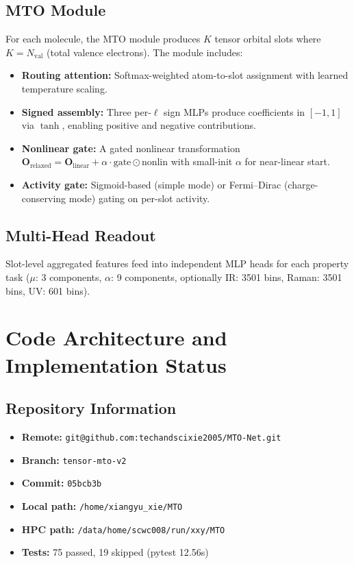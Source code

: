 \documentclass[11pt,a4paper]{article}
\begin{document}
\subsection{MTO Module}
For each molecule, the MTO module produces $K$ tensor orbital slots where $K = N_\text{val}$ (total valence electrons). The module includes:
\begin{itemize}[nosep]
    \item \textbf{Routing attention:} Softmax-weighted atom-to-slot assignment with learned temperature scaling.
    \item \textbf{Signed assembly:} Three per-$\ell$ sign MLPs produce coefficients in $[-1,1]$ via $\tanh$, enabling positive and negative contributions.
    \item \textbf{Nonlinear gate:} A gated nonlinear transformation $\mathbf{O}_\text{relaxed} = \mathbf{O}_\text{linear} + \alpha \cdot \text{gate} \odot \text{nonlin}$ with small-init $\alpha$ for near-linear start.
    \item \textbf{Activity gate:} Sigmoid-based (simple mode) or Fermi--Dirac (charge-conserving mode) gating on per-slot activity.
\end{itemize}

\subsection{Multi-Head Readout}
Slot-level aggregated features feed into independent MLP heads for each property task ($\mu$: 3 components, $\alpha$: 9 components, optionally IR: 3501 bins, Raman: 3501 bins, UV: 601 bins).

\section{Code Architecture and Implementation Status}

\subsection{Repository Information}
\begin{itemize}[nosep]
    \item \textbf{Remote:} \texttt{git@github.com:techandscixie2005/MTO-Net.git}
    \item \textbf{Branch:} \texttt{tensor-mto-v2}
    \item \textbf{Commit:} \texttt{05bcb3b}
    \item \textbf{Local path:} \texttt{/home/xiangyu\_xie/MTO}
    \item \textbf{HPC path:} \texttt{/data/home/scwc008/run/xxy/MTO}
    \item \textbf{Tests:} 75 passed, 19 skipped (pytest 12.56s)
\end{itemize}
\end{document}
